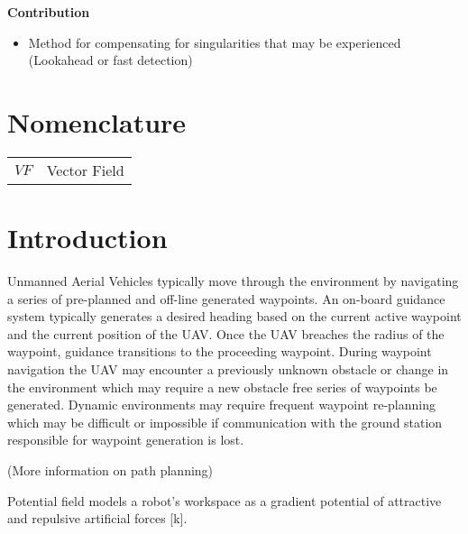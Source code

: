 \documentclass[conf]{new-aiaa}
\begin{document}
\textbf{Contribution}
\begin{itemize}
	\item Method for compensating for singularities that may be experienced (Lookahead or fast detection)
\end{itemize}




\section{Nomenclature}

{\renewcommand\arraystretch{1.0}
\noindent\begin{longtable*}{@{}l @{\quad=\quad} l@{}}
$VF$  & Vector Field \\
\end{longtable*}}

\section{Introduction}

Unmanned Aerial Vehicles typically move through the environment by navigating a series of pre-planned and off-line generated waypoints. An on-board guidance system typically generates a desired heading based on the current active waypoint and the current position of the UAV. Once the UAV breaches the radius of the waypoint, guidance transitions to the proceeding waypoint. During waypoint navigation the UAV may encounter a previously unknown obstacle or change in the environment which may require a new obstacle free series of waypoints be generated. Dynamic environments may require frequent waypoint re-planning which may be difficult or impossible if communication with the ground station responsible for waypoint generation is lost. 

(More information on path planning)


Potential field models a robot's workspace as a gradient potential of attractive and repulsive artificial forces [k]. 
\end{document}

